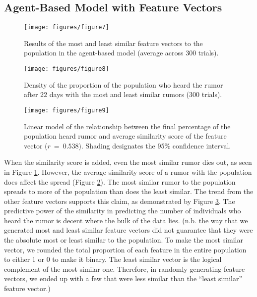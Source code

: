 \subsection{Agent-Based Model with Feature Vectors}
\label{subsec:featvect}

\begin{figure}[H]
\captionsetup{width=0.8\textwidth}
\centering
    \texttt{[image: figures/figure7]}
  \caption{ Results of the most and least similar feature vectors to the population in the agent-based model (average across $ 300 $ trials).
}
  \label{fig:figure7}
\end{figure}

\begin{figure}[H]
\captionsetup{width=0.8\textwidth}
\centering
    \texttt{[image: figures/figure8]}
  \caption{ Density of the proportion of the population who heard the rumor after $ 22 $ days with the most and least similar rumors ($ 300 $ trials).
}
  \label{fig:figure8}
\end{figure}

\begin{figure}[H]
\captionsetup{width=0.8\textwidth}
\centering
    \texttt{[image: figures/figure9]}
  \caption{ Linear model of the relationship between the final percentage of the population heard rumor and average similarity score of the feature vector ($ r~=~0.538 $).
Shading designates the 95\% confidence interval.
}
  \label{fig:figure9}
\end{figure}

When the similarity score is added, even the most similar rumor dies out, as seen in Figure \ref{fig:figure7}.
However, the average similarity score of a rumor with the population does affect the spread (Figure \ref{fig:figure8}).
The most similar rumor to the population spreads to more of the population than does the least similar.
The trend from the other feature vectors supports this claim, as demonstrated by Figure \ref{fig:figure9}.
The predictive power of the similarity in predicting the number of individuals who heard the rumor is decent where the bulk of the data lies.
(n.b. the way that we generated most and least similar feature vectors did not guarantee that they were the absolute most or least similar to the population.
To make the most similar vector, we rounded the total proportion of each feature in the entire population to either $ 1 $ or $ 0 $ to make it binary.
The least similar vector is the logical complement of the most similar one.
Therefore, in randomly generating feature vectors, we ended up with a few that were less similar than the ``least similar'' feature vector.)
